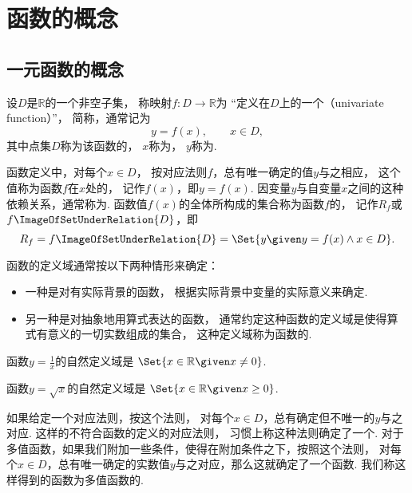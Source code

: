 \section{函数的概念}
\subsection{一元函数的概念}
设\(D\)是\(\mathbb{R}\)的一个非空子集，
称映射\(f\colon D \to \mathbb{R}\)为
“定义在\(D\)上的一个（univariate function）”，
简称，通常记为\begin{equation*}
	y = f(x), \qquad x \in D,
\end{equation*}
其中点集\(D\)称为该函数的，
\(x\)称为，
\(y\)称为.

函数定义中，对每个\(x \in D\)，
按对应法则\(f\)，总有唯一确定的值\(y\)与之相应，
这个值称为函数\(f\)在\(x\)处的，
记作\(f(x)\)，即\(y=f(x)\).
因变量\(y\)与自变量\(x\)之间的这种依赖关系，通常称为.
函数值\(f(x)\)的全体所构成的集合称为函数\(f\)的，
记作\(R_f\)或\(f\ImageOfSetUnderRelation{D}\)，即\begin{equation*}
	R_f = f\ImageOfSetUnderRelation{D} = \Set{ y \given y = f(x) \land x \in D }.
\end{equation*}

函数的定义域通常按以下两种情形来确定：
\begin{itemize}
	\item 一种是对有实际背景的函数，
	根据实际背景中变量的实际意义来确定.
	\item 另一种是对抽象地用算式表达的函数，
	通常约定这种函数的定义域是使得算式有意义的一切实数组成的集合，
	这种定义域称为函数的.
\end{itemize}

\begin{example}
函数\(y = \frac{1}{x}\)的自然定义域是
\(\Set{ x \in \mathbb{R} \given x \neq 0 }\).
\end{example}

\begin{example}
函数\(y = \sqrt{x}\)的自然定义域是
\(\Set{ x \in \mathbb{R} \given x \geq 0 }\).
\end{example}

如果给定一个对应法则，按这个法则，
对每个\(x \in D\)，总有确定但不唯一的\(y\)与之对应.
这样的不符合函数的定义的对应法则，
习惯上称这种法则确定了一个.
对于多值函数，如果我们附加一些条件，使得在附加条件之下，按照这个法则，
对每个\(x \in D\)，总有唯一确定的实数值\(y\)与之对应，那么这就确定了一个函数.
我们称这样得到的函数为多值函数的.

